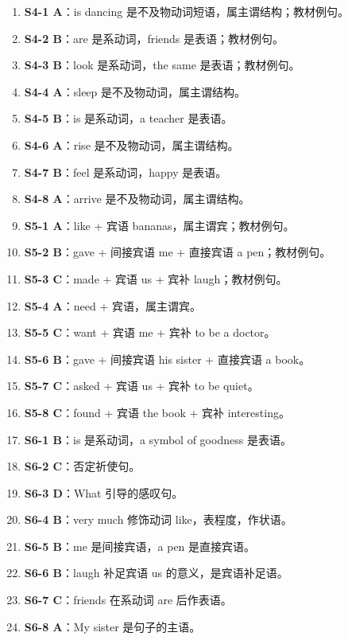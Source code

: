 \documentclass[11pt,a4paper]{ctexart}
\begin{document}
\begin{enumerate}[leftmargin=1.6em,itemsep=2pt]
\item \textbf{S4-1 A}：is dancing 是不及物动词短语，属主谓结构；教材例句。
\item \textbf{S4-2 B}：are 是系动词，friends 是表语；教材例句。
\item \textbf{S4-3 B}：look 是系动词，the same 是表语；教材例句。
\item \textbf{S4-4 A}：sleep 是不及物动词，属主谓结构。
\item \textbf{S4-5 B}：is 是系动词，a teacher 是表语。
\item \textbf{S4-6 A}：rise 是不及物动词，属主谓结构。
\item \textbf{S4-7 B}：feel 是系动词，happy 是表语。
\item \textbf{S4-8 A}：arrive 是不及物动词，属主谓结构。
\item \textbf{S5-1 A}：like + 宾语 bananas，属主谓宾；教材例句。
\item \textbf{S5-2 B}：gave + 间接宾语 me + 直接宾语 a pen；教材例句。
\item \textbf{S5-3 C}：made + 宾语 us + 宾补 laugh；教材例句。
\item \textbf{S5-4 A}：need + 宾语，属主谓宾。
\item \textbf{S5-5 C}：want + 宾语 me + 宾补 to be a doctor。
\item \textbf{S5-6 B}：gave + 间接宾语 his sister + 直接宾语 a book。
\item \textbf{S5-7 C}：asked + 宾语 us + 宾补 to be quiet。
\item \textbf{S5-8 C}：found + 宾语 the book + 宾补 interesting。
\item \textbf{S6-1 B}：is 是系动词，a symbol of goodness 是表语。
\item \textbf{S6-2 C}：否定祈使句。
\item \textbf{S6-3 D}：What 引导的感叹句。
\item \textbf{S6-4 B}：very much 修饰动词 like，表程度，作状语。
\item \textbf{S6-5 B}：me 是间接宾语，a pen 是直接宾语。
\item \textbf{S6-6 B}：laugh 补足宾语 us 的意义，是宾语补足语。
\item \textbf{S6-7 C}：friends 在系动词 are 后作表语。
\item \textbf{S6-8 A}：My sister 是句子的主语。
\end{enumerate}
\end{document}
